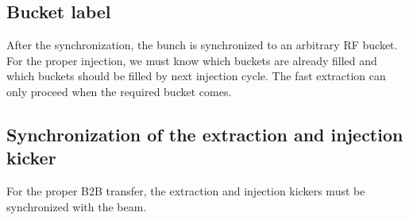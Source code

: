 %
%
%
%
%



\subsection{Bucket label}
After the synchronization, the bunch is synchronized to an arbitrary RF bucket. For the proper injection, we must know which buckets are already filled and which buckets should be filled by next injection cycle. The fast extraction can only proceed when the required bucket comes. 

\subsection{Synchronization of the extraction and injection kicker}
For the proper B2B transfer, the extraction and injection kickers must be synchronized with the beam.
 
